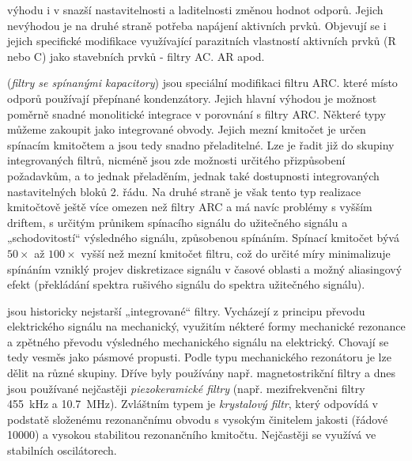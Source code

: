 \begin{description}[noitemsep, font=\small]
              výhodu i v snazší nastavitelnosti a laditelnosti změnou hodnot odporů. Jejich
              nevýhodou je na druhé straně potřeba napájení aktivních prvků. Objevují se i jejich
              specifické modifikace využívající parazitních vlastností aktivních prvků (R nebo C)
              jako stavebních prvků - filtry AC. AR apod.
        \item[\textbf{Filtry ASC}] (\emph{filtry se spínanými kapacitory}) jsou speciální
              modifikaci filtru ARC. které místo odporů používají přepínané kondenzátory. Jejich
              hlavní výhodou je možnost poměrně snadné monolitické integrace v porovnání s filtry
              ARC. Některé typy můžeme zakoupit jako integrované obvody. Jejich mezní kmitočet je
              určen spínacím kmitočtem a jsou tedy snadno přeladitelné. Lze je řadit již do
              skupiny integrovaných filtrů, nicméně jsou zde možnosti určitého přizpůsobení
              požadavkům, a to jednak přeladěním, jednak také dostupnosti integrovaných
              nastavitelných bloků 2. řádu. Na druhé straně je však tento typ realizace kmitočtově
              ještě více omezen než filtry ARC a má navíc problémy s vyšším driftem, s určitým
              průnikem spínacího signálu do užitečného signálu a „schodovitostí“ výsledného
              signálu, způsobenou spínáním. Spínací kmitočet bývá \(\num{50}\times\) až
              \(\num{100}\times\) vyšší než mezní kmitočet filtru, což do určité míry minimalizuje
              spínáním vzniklý projev diskretizace signálu v časové oblasti a možný aliasingový
              efekt (překládání spektra rušivého signálu do spektra užitečného signálu).
        \item[\textbf{Elektromechanické filtry}] jsou historicky nejstarší „integrované“ filtry.
              Vycházejí z principu převodu elektrického signálu na mechanický, využitím nékteré
              formy mechanické rezonance a zpětného převodu výsledného mechanického signálu na
              elektrický. Chovají se tedy vesměs jako pásmové propusti. Podle typu mechanického
              rezonátoru je lze dělit na různé skupiny. Dříve byly používány např. magnetostrikční
              filtry a dnes jsou používané nejčastěji \emph{piezokeramické filtry} (např.
              mezifrekvenčni filtry \SI{455}{\kilo\hertz} a \SI{10.7}{\mega\hertz}).
              Zvláštním typem je \emph{krystalový filtr}, který odpovídá v podstatě složenému
              rezonančnímu obvodu s vysokým činitelem jakosti (řádové \num{10000}) a vysokou
              stabilitou rezonančního kmitočtu. Nejčastěji se využívá ve stabilních oscilátorech.

\end{description}
